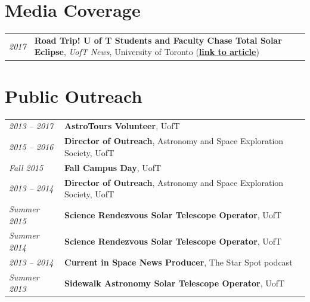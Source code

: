 \documentclass[10pt]{res} %
\begin{document}
\begin{resume}
\newpage
\section{\Large Media Coverage}
\vspace{-5pt} %
\noindent\makebox[\linewidth]{\rule{\textwidth}{0.4pt}}
\vspace{-20pt} %

\begin{table}[h!]
\begin{tabularx}{\textwidth}{lX}
\textit{2017} & \textbf{Road Trip! U of T Students and Faculty Chase Total Solar Eclipse}, \textit{UofT News}, University of Toronto (\href{https://www.utoronto.ca/news/road-trip-u-t-students-and-faculty-chase-total-solar-eclipse}{\textbf{link to article}})
\end{tabularx}
\end{table}


\section{\Large Public Outreach}
\vspace{-5pt} %
\noindent\makebox[\linewidth]{\rule{\textwidth}{0.4pt}}
\vspace{-20pt} %

\begin{table}[h!]
\begin{tabularx}{\textwidth}{lX}
\textit{2013 -- 2017} & \textbf{AstroTours Volunteer}, UofT \\
\textit{2015 -- 2016} & \textbf{Director of Outreach}, Astronomy and Space Exploration Society, UofT \\
\textit{Fall 2015} & \textbf{Fall Campus Day}, UofT \\
\textit{2013 -- 2014} & \textbf{Director of Outreach}, Astronomy and Space Exploration Society, UofT \\
\textit{Summer 2015} & \textbf{Science Rendezvous Solar Telescope Operator}, UofT \\
\textit{Summer 2014} & \textbf{Science Rendezvous Solar Telescope Operator}, UofT \\
\textit{2013 -- 2014} & \textbf{Current in Space News Producer}, The Star Spot podcast \\
\textit{Summer 2013} & \textbf{Sidewalk Astronomy Solar Telescope Operator}, UofT
\end{tabularx}
\end{table}



\end{resume} 
\end{document}
